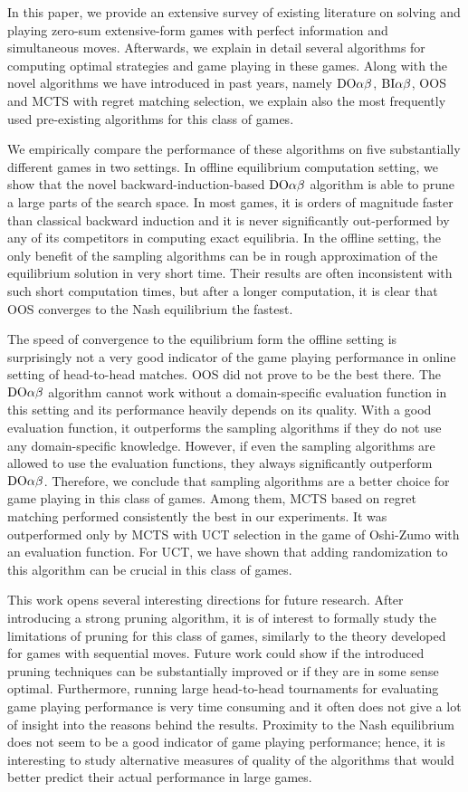 
In this paper, we provide an extensive survey of existing literature on solving and playing zero-sum extensive-form games with perfect information and simultaneous moves. Afterwards, we explain in detail several algorithms for computing optimal strategies and game playing in these games. Along with the novel algorithms we have introduced in past years, namely $\textrm{DO}\alpha\beta$, $\textrm{BI}\alpha\beta$, OOS and MCTS with regret matching selection, we explain also the most frequently used pre-existing algorithms for this class of games.

We empirically compare the performance of these algorithms on five substantially different games in two settings. In offline equilibrium computation setting, we show that the novel backward-induction-based $\textrm{DO}\alpha\beta$ algorithm is able to prune a large parts of the search space. In most games, it is orders of magnitude faster than classical backward induction and it is never significantly out-performed by any of its competitors in computing exact equilibria. In the offline setting, the only benefit of the sampling algorithms can be in rough approximation of the equilibrium solution in very short time. Their results are often inconsistent with such short computation times, but after a longer computation, it is clear that OOS converges to the Nash equilibrium the fastest.

The speed of convergence to the equilibrium form the offline setting is surprisingly not a very good indicator of the game playing performance in online setting of head-to-head matches. OOS did not prove to be the best there. The $\textrm{DO}\alpha\beta$ algorithm cannot work without a domain-specific evaluation function in this setting and its performance heavily depends on its quality. With a good evaluation function, it outperforms the sampling algorithms if they do not use any domain-specific knowledge. However, if even the sampling algorithms are allowed to use the evaluation functions, they always significantly outperform $\textrm{DO}\alpha\beta$. Therefore, we conclude that sampling algorithms are a better choice for game playing in this class of games. Among them, MCTS based on regret matching performed consistently the best in our experiments. It was outperformed only by MCTS with UCT selection in the game of Oshi-Zumo with an evaluation function. For UCT, we have shown that adding randomization to this algorithm can be crucial in this class of games.

This work opens several interesting directions for future research. After introducing a strong pruning algorithm, it is of interest to formally study the limitations of pruning  for this class of games, similarly to the theory developed for games with sequential moves. Future work could show if the introduced pruning techniques can be substantially improved or if they are in some sense optimal.
Furthermore, running large head-to-head tournaments for evaluating game playing performance is very time consuming and it often does not give a lot of insight into the reasons behind the results. Proximity to the Nash equilibrium does not seem to be a good indicator of game playing performance; hence, it is interesting to study alternative measures of quality of the algorithms that would better predict their actual performance in large games. \\

